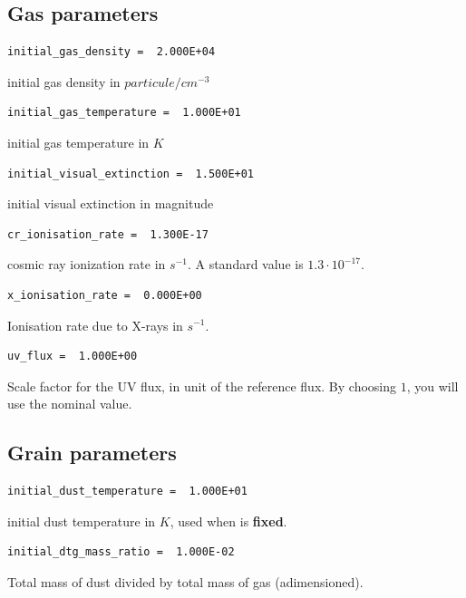 \documentclass[english,a4paper,twoside]{article}
\begin{document}
\subsection{Gas parameters}


\begin{verbatim}
initial_gas_density =  2.000E+04
\end{verbatim}
initial gas density in $\unit{particule/cm^{-3}}$

\begin{verbatim}
initial_gas_temperature =  1.000E+01
\end{verbatim}
initial gas temperature  in $\unit{K}$

\begin{verbatim}
initial_visual_extinction =  1.500E+01
\end{verbatim}
initial visual extinction in magnitude

\begin{verbatim}
cr_ionisation_rate =  1.300E-17
\end{verbatim}
cosmic ray ionization rate in $\unit{s^{-1}}$. A standard value is $1.3\cdot 10^{-17}$.

\begin{verbatim}
x_ionisation_rate =  0.000E+00
\end{verbatim}
Ionisation rate due to X-rays in $\unit{s^{-1}}$.

\begin{verbatim}
uv_flux =  1.000E+00
\end{verbatim}
Scale factor for the UV flux, in unit of the reference flux. By choosing $1$, you will use the nominal value.

\subsection{Grain parameters}
\begin{verbatim}
initial_dust_temperature =  1.000E+01
\end{verbatim}
initial dust temperature in $\unit{K}$, used when  is \textbf{fixed}.

\begin{verbatim}
initial_dtg_mass_ratio =  1.000E-02
\end{verbatim}
Total mass of dust divided by total mass of gas (adimensioned).
\end{document}
